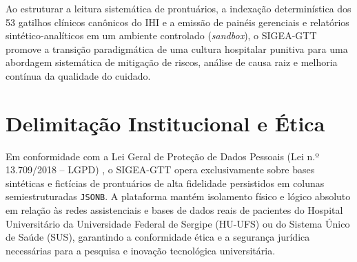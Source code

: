 Ao estruturar a leitura sistemática de prontuários, a indexação determinística dos 53 gatilhos clínicos canônicos do IHI e a emissão de painéis gerenciais e relatórios sintético-analíticos em um ambiente controlado (\textit{sandbox}), o SIGEA-GTT promove a transição paradigmática de uma cultura hospitalar punitiva para uma abordagem sistemática de mitigação de riscos, análise de causa raiz e melhoria contínua da qualidade do cuidado.

\section{Delimitação Institucional e Ética}
\label{sec_delimitacao_etica}

Em conformidade com a Lei Geral de Proteção de Dados Pessoais (Lei n.º 13.709/2018 -- LGPD) \cite{lgpd2018}, o SIGEA-GTT opera exclusivamente sobre bases sintéticas e fictícias de prontuários de alta fidelidade persistidos em colunas semiestruturadas \texttt{JSONB}. A plataforma mantém isolamento físico e lógico absoluto em relação às redes assistenciais e bases de dados reais de pacientes do Hospital Universitário da Universidade Federal de Sergipe (HU-UFS) ou do Sistema Único de Saúde (SUS), garantindo a conformidade ética e a segurança jurídica necessárias para a pesquisa e inovação tecnológica universitária.
